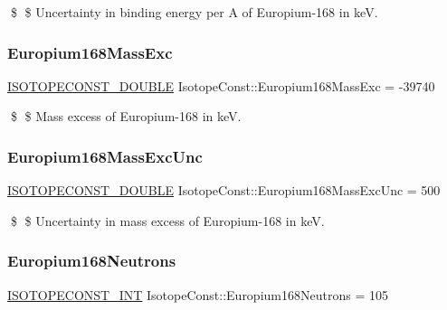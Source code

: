 \$ \$ Uncertainty in binding energy per A of Europium-\/168 in keV. \mbox{\label{group___isotope_const-_europium-_eu168_ga4434c25676f2402bf2757ea0f84067ec}} 
\subsubsection{\texorpdfstring{Europium168\+Mass\+Exc}{Europium168MassExc}}
{\footnotesize\ttfamily \mbox{\hyperlink{group___isotope_const-_macros_ga8f45a7272ce02c0b4c65c44636ed719a}{I\+S\+O\+T\+O\+P\+E\+C\+O\+N\+S\+T\+\_\+\+D\+O\+U\+B\+LE}} Isotope\+Const\+::\+Europium168\+Mass\+Exc = -\/39740}

\$ \$ Mass excess of Europium-\/168 in keV. \mbox{\label{group___isotope_const-_europium-_eu168_gaf4782cc787aa597dc03a58fc62d00950}} 
\subsubsection{\texorpdfstring{Europium168\+Mass\+Exc\+Unc}{Europium168MassExcUnc}}
{\footnotesize\ttfamily \mbox{\hyperlink{group___isotope_const-_macros_ga8f45a7272ce02c0b4c65c44636ed719a}{I\+S\+O\+T\+O\+P\+E\+C\+O\+N\+S\+T\+\_\+\+D\+O\+U\+B\+LE}} Isotope\+Const\+::\+Europium168\+Mass\+Exc\+Unc = 500}

\$ \$ Uncertainty in mass excess of Europium-\/168 in keV. \mbox{\label{group___isotope_const-_europium-_eu168_ga14e0d6fd1dddc3ca91c4bf6614e9ad8f}} 
\subsubsection{\texorpdfstring{Europium168\+Neutrons}{Europium168Neutrons}}
{\footnotesize\ttfamily \mbox{\hyperlink{group___isotope_const-_macros_ga5f18360b3e99483a35c32d789e62621c}{I\+S\+O\+T\+O\+P\+E\+C\+O\+N\+S\+T\+\_\+\+I\+NT}} Isotope\+Const\+::\+Europium168\+Neutrons = 105}

